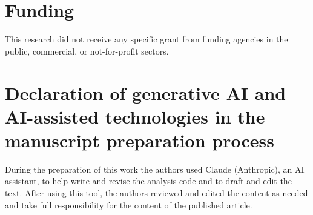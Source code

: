 \section*{Funding}
This research did not receive any specific grant from funding agencies in the public, commercial, or not-for-profit sectors.

\section*{Declaration of generative AI and AI-assisted technologies in the manuscript preparation process}
During the preparation of this work the authors used Claude (Anthropic), an AI assistant, to help write and revise the analysis code and to draft and edit the text. After using this tool, the authors reviewed and edited the content as needed and take full responsibility for the content of the published article.
